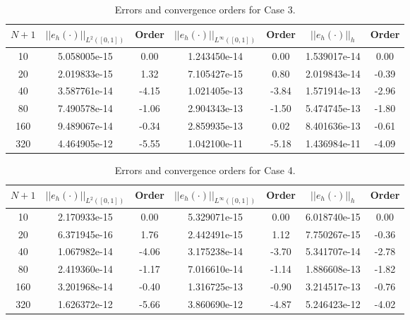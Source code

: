 \documentclass[a4paper, 12pt]{article}
\begin{document}
\begin{table}[!ht]
\caption{Errors and convergence orders for Case 3.}
\vspace{0.1in}
\centering
\begin{tabular}{|c|c|c| c| c| c| c|}
\hline
 $N+1$&  $||e_h(\cdot)||_{L^2([0,1])}$ & Order  & $||e_h(\cdot)||_{L^\infty([0,1])}$ & Order& $||e_h(\cdot)||_h$& Order \\
 \hline
     10  & 5.058005e-15 &  0.00 & 1.243450e-14 &  0.00 & 1.539017e-14 &  0.00\\
     20  & 2.019833e-15 &  1.32 & 7.105427e-15 &  0.80 & 2.019843e-14 & -0.39\\
     40  & 3.587761e-14 & -4.15 & 1.021405e-13 & -3.84 & 1.571914e-13 & -2.96\\
     80  & 7.490578e-14 & -1.06 & 2.904343e-13 & -1.50 & 5.474745e-13 & -1.80\\
     160 & 9.489067e-14 & -0.34 & 2.859935e-13 &  0.02 & 8.401636e-13 & -0.61\\
     320 & 4.464905e-12 & -5.55 & 1.042100e-11 & -5.18 & 1.436984e-11 & -4.09\\
\hline
\end{tabular}
\label{tab:C3}
\end{table}

\begin{table}[!ht]
\caption{Errors and convergence orders for Case 4.}
\vspace{0.1in}
\centering
\begin{tabular}{|c|c|c| c| c| c| c|}
\hline
 $N+1$&  $||e_h(\cdot)||_{L^2([0,1])}$ & Order  & $||e_h(\cdot)||_{L^\infty([0,1])}$ & Order& $||e_h(\cdot)||_h$& Order \\
 \hline
     10  & 2.170933e-15 &  0.00 & 5.329071e-15 &  0.00 & 6.018740e-15  &  0.00\\
     20  & 6.371945e-16 &  1.76 & 2.442491e-15 &  1.12 & 7.750267e-15  & -0.36\\
     40  & 1.067982e-14 & -4.06 & 3.175238e-14 & -3.70 & 5.341707e-14  & -2.78\\
     80  & 2.419360e-14 & -1.17 & 7.016610e-14 & -1.14 & 1.886608e-13  & -1.82\\
     160 & 3.201968e-14 & -0.40 & 1.316725e-13 & -0.90 & 3.214517e-13  & -0.76\\
     320 & 1.626372e-12 & -5.66 & 3.860690e-12 & -4.87 & 5.246423e-12  & -4.02\\
\hline
\end{tabular}
\label{tab:C4}
\end{table}
\end{document}
